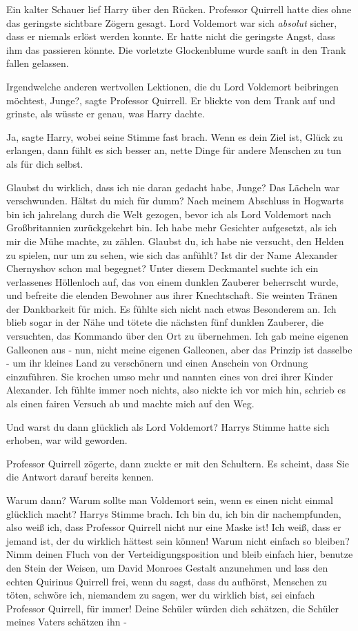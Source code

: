Ein kalter Schauer lief Harry über den Rücken. Professor Quirrell hatte dies
ohne das geringste sichtbare Zögern gesagt. Lord Voldemort war sich
\emph{absolut} sicher, dass er niemals erlöst werden konnte. Er hatte nicht die
geringste Angst, dass ihm das passieren könnte. Die vorletzte Glockenblume wurde
sanft in den Trank fallen gelassen.

\glqq{}Irgendwelche anderen wertvollen Lektionen, die du Lord Voldemort
beibringen möchtest, Junge?\grqq{}, sagte Professor Quirrell. Er blickte von dem
Trank auf und grinste, als wüsste er genau, was Harry dachte.

\glqq{}Ja\grqq{}, sagte Harry, wobei seine Stimme fast brach. \glqq{}Wenn es dein
Ziel ist, Glück zu erlangen, dann fühlt es sich besser an, nette Dinge für
andere Menschen zu tun als für dich selbst.\grqq{}

\glqq{}Glaubst du wirklich, dass ich nie daran gedacht habe, Junge?\grqq{} Das Lächeln
war verschwunden. \glqq{}Hältst du mich für dumm? Nach meinem Abschluss in
Hogwarts bin ich jahrelang durch die Welt gezogen, bevor ich als Lord Voldemort
nach Großbritannien zurückgekehrt bin. Ich habe mehr Gesichter aufgesetzt, als
ich mir die Mühe machte, zu zählen. Glaubst du, ich habe nie versucht, den
Helden zu spielen, nur um zu sehen, wie sich das anfühlt? Ist dir der Name
Alexander Chernyshov schon mal begegnet? Unter diesem Deckmantel suchte ich ein
verlassenes Höllenloch auf, das von einem dunklen Zauberer beherrscht wurde, und
befreite die elenden Bewohner aus ihrer Knechtschaft. Sie weinten Tränen der
Dankbarkeit für mich. Es fühlte sich nicht nach etwas Besonderem an. Ich blieb
sogar in der Nähe und tötete die nächsten fünf dunklen Zauberer, die versuchten,
das Kommando über den Ort zu übernehmen. Ich gab meine eigenen Galleonen aus -
nun, nicht meine eigenen Galleonen, aber das Prinzip ist dasselbe - um ihr
kleines Land zu verschönern und einen Anschein von Ordnung einzuführen. Sie
krochen umso mehr und nannten eines von drei ihrer Kinder Alexander. Ich fühlte
immer noch nichts, also nickte ich vor mich hin, schrieb es als einen fairen
Versuch ab und machte mich auf den Weg.\grqq{}

Und warst du dann glücklich als Lord Voldemort?\grqq{} Harrys Stimme hatte sich
erhoben, war wild geworden.

Professor Quirrell zögerte, dann zuckte er mit den Schultern. \glqq{}Es scheint,
dass Sie die Antwort darauf bereits kennen.\grqq{}

\glqq{}Warum dann? Warum sollte man Voldemort sein, wenn es einen nicht einmal
glücklich macht?\grqq{} Harrys Stimme brach. \glqq{}Ich bin du, ich bin dir
nachempfunden, also weiß ich, dass Professor Quirrell nicht nur eine Maske ist!
Ich weiß, dass er jemand ist, der du wirklich hättest sein können! Warum nicht
einfach so bleiben? Nimm deinen Fluch von der Verteidigungsposition und bleib
einfach hier, benutze den Stein der Weisen, um David Monroes Gestalt anzunehmen
und lass den echten Quirinus Quirrell frei, wenn du sagst, dass du aufhörst,
Menschen zu töten, schwöre ich, niemandem zu sagen, wer du wirklich bist, sei
einfach Professor Quirrell, für immer! Deine Schüler würden dich schätzen, die
Schüler meines Vaters schätzen ihn -\grqq{}

